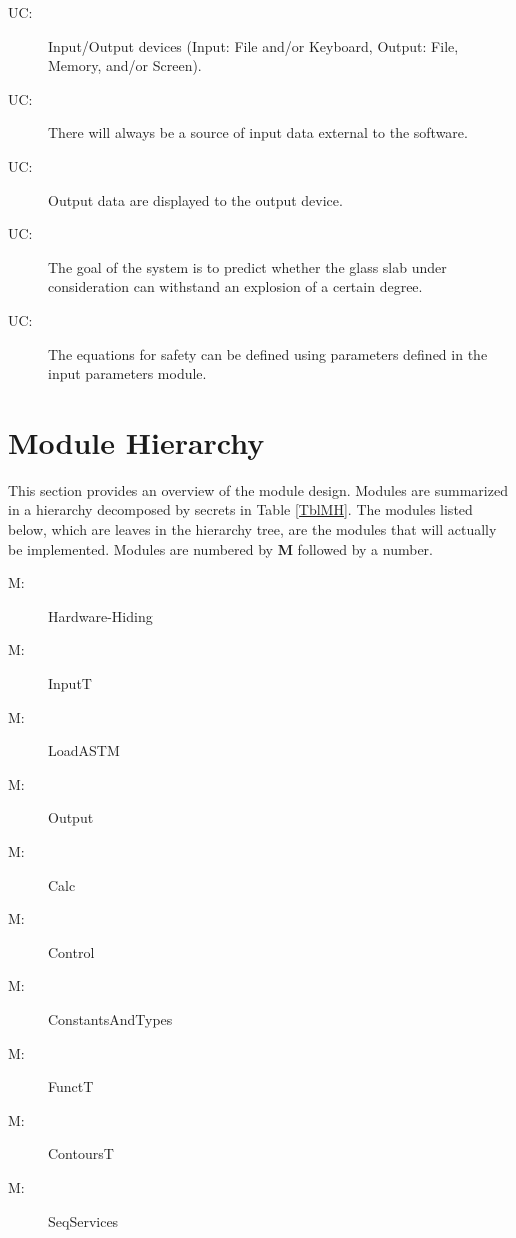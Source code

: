 \documentclass[12pt]{article}
\newcounter{ucnum}
\newcommand{\uctheucnum}{UC\theucnum}
\newcounter{mnum}
\newcommand{\mthemnum}{M\themnum}
\begin{document}
\begin{description}
\item[ \uctheucnum \label{ucIO}:] Input/Output devices
  (Input: File and/or Keyboard, Output: File, Memory, and/or Screen).
\item[ \uctheucnum \label{ucInput}:] There will always be
  a source of input data external to the software.
\item[ \uctheucnum \label{ucOutput}:] Output data are
  displayed to the output device.
\item[ \uctheucnum \label{ucGoal}:] The goal of the system
  is to predict whether the glass slab under consideration can withstand an 
  explosion of a certain degree.
\item[ \uctheucnum \label{ucODEstructure}:] The 
equations for safety can be defined using parameters defined in the input parameters 
module.

\end{description}

\section{Module Hierarchy} \label{SecMH}


This section provides an overview of the module design. Modules are summarized
in a hierarchy decomposed by secrets in Table \ref{TblMH}. The modules listed
below, which are leaves in the hierarchy tree, are the modules that will
actually be implemented.  Modules are numbered by \textbf{M}
followed by a number.

\begin{description}
\item [ \mthemnum \label{mHH}:] Hardware-Hiding
\item [ \mthemnum \label{mParams}:] InputT
\item [ \mthemnum \label{mLoad}:] LoadASTM
\item [ \mthemnum \label{mOutput}:] Output
\item [ \mthemnum \label{mCalc}:]  Calc
\item [ \mthemnum \label{mControl}:] Control
\item [ \mthemnum \label{mConstants}:] ConstantsAndTypes
\item [ \mthemnum \label{mFunctT}:] FunctT
\item [ \mthemnum \label{mContoursT}:] ContoursT
\item [ \mthemnum \label{mSeqServices}:] SeqServices
\end{description}
\end{document}
